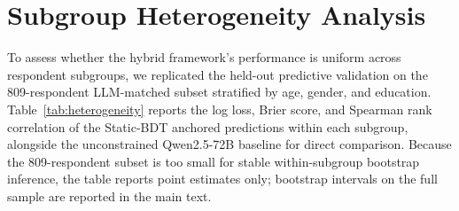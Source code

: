 \documentclass[11pt]{article}
\begin{document}
\section{Subgroup Heterogeneity Analysis}
\label{app:heterogeneity}

To assess whether the hybrid framework's performance is uniform across respondent subgroups, we replicated the held-out predictive validation on the 809-respondent LLM-matched subset stratified by age, gender, and education. Table~\ref{tab:heterogeneity} reports the log loss, Brier score, and Spearman rank correlation of the Static-BDT anchored predictions within each subgroup, alongside the unconstrained Qwen2.5-72B baseline for direct comparison. Because the 809-respondent subset is too small for stable within-subgroup bootstrap inference, the table reports point estimates only; bootstrap intervals on the full sample are reported in the main text.
\end{document}
